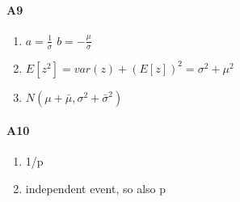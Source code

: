 \documentclass[11pt]{article}
\begin{document}
\paragraph{A9} 
\begin{enumerate}
    \item $a = \frac{1}{\sigma}$ $b = -\frac{\mu}{\sigma}$
    \item $E[z^2] = var(z) + (E[z])^2 = \sigma^2 + \mu^2$
    \item $N(\mu + \bar \mu, \sigma^2 + \bar \sigma^2)$
\end{enumerate}

\paragraph{A10} 
\begin{enumerate}
    \item 1/p
    \item independent event, so also p
\end{enumerate}
\end{document}
